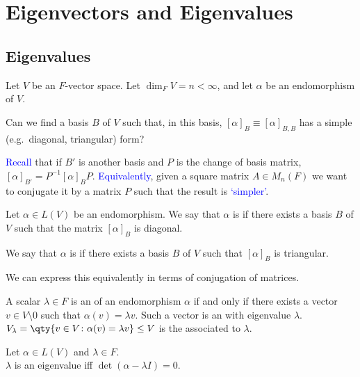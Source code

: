 \section{Eigenvectors and Eigenvalues}

\subsection{Eigenvalues}
Let $V$ be an $F$-vector space.
Let $\dim_F V = n < \infty$, and let $\alpha$ be an endomorphism of $V$.
\begin{question}
	Can we find a basis $B$ of $V$ such that, in this basis, $[\alpha]_B \equiv [\alpha]_{B,B}$ has a simple (e.g.\ diagonal, triangular) form?
\end{question} 
\textcolor{blue}{Recall} that if $B'$ is another basis and $P$ is the change of basis matrix, $[\alpha]_{B'} = P^{-1} [\alpha]_B P$.
\textcolor{blue}{Equivalently}, given a square matrix $A \in M_n(F)$ we want to conjugate it by a matrix $P$ such that the result is \textcolor{blue}{`simpler'}.

\begin{definition}[Diagonalisable]
	Let $\alpha \in L(V)$ be an endomorphism.
	We say that $\alpha$ is  if there exists a basis $B$ of $V$ such that the matrix $[\alpha]_B$ is diagonal.
\end{definition}

\begin{definition}[Triangulable]
	We say that $\alpha$ is  if there exists a basis $B$ of $V$ such that $[\alpha]_B$ is triangular.
\end{definition} 

\begin{remark}
	We can express this equivalently in terms of conjugation of matrices.
\end{remark}

\begin{definition}
	A scalar $\lambda \in F$ is an  of an endomorphism $\alpha$ if and only if there exists a vector $v \in V \setminus \qty{0}$ such that $\alpha(v) = \lambda v$.
	Such a vector is an  with eigenvalue $\lambda$. \\
	$V_\lambda = \qty{ v \in V \colon \alpha(v) = \lambda v } \leq V$ is the  associated to $\lambda$.
\end{definition}

\begin{lemma}
	Let $\alpha \in L(V)$ and $\lambda \in F$. \\
	$\lambda$ is an eigenvalue iff $\det(\alpha - \lambda I) = 0$.
\end{lemma}

